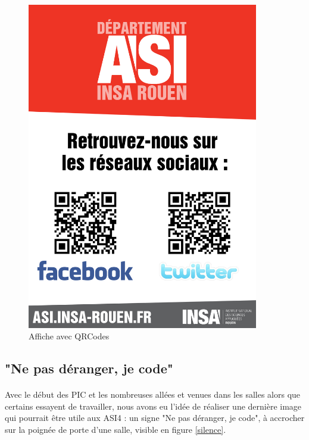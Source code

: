 		\begin{figure}
			\begin{center}
				\includegraphics[width=0.9\textwidth]{images/affiche.jpg}
				\caption{\label{affiche} Affiche avec QRCodes}
			\end{center}
		\end{figure}
		
	\subsection{"Ne pas déranger, je code"}

		\paragraph{}
		Avec le début des PIC et les nombreuses allées et venues dans les salles alors que certains essayent de travailler, nous avons eu l'idée de 
		réaliser une dernière image qui pourrait être utile aux ASI4 : un signe "Ne pas déranger, je code", à accrocher sur la poignée de porte 
		d'une salle, visible en figure \ref{silence}.

